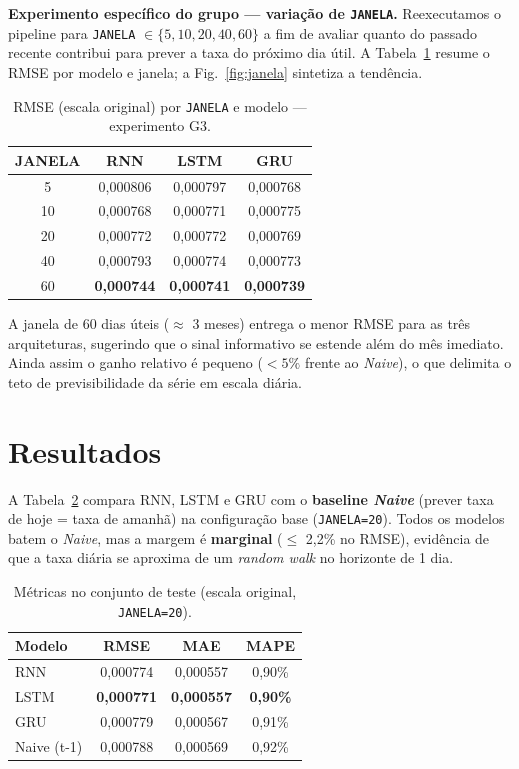 \documentclass[11pt,a4paper]{article}
\begin{document}
\textbf{Experimento específico do grupo --- variação de \texttt{JANELA}.} Reexecutamos o pipeline para \texttt{JANELA} $\in \{5, 10, 20, 40, 60\}$ a fim de avaliar quanto do passado recente contribui para prever a taxa do próximo dia útil. A Tabela~\ref{tab:janela} resume o RMSE por modelo e janela; a Fig.~\ref{fig:janela} sintetiza a tendência.

\begin{table}[h]
\centering
\small
\caption{RMSE (escala original) por \texttt{JANELA} e modelo --- experimento G3.}
\label{tab:janela}
\begin{tabular}{cccc}
\toprule
\textbf{JANELA} & \textbf{RNN} & \textbf{LSTM} & \textbf{GRU} \\
\midrule
5  & 0,000806 & 0,000797 & 0,000768 \\
10 & 0,000768 & 0,000771 & 0,000775 \\
20 & 0,000772 & 0,000772 & 0,000769 \\
40 & 0,000793 & 0,000774 & 0,000773 \\
60 & \textbf{0,000744} & \textbf{0,000741} & \textbf{0,000739} \\
\bottomrule
\end{tabular}
\end{table}

A janela de 60 dias úteis ($\approx$ 3 meses) entrega o menor RMSE para as três arquiteturas, sugerindo que o sinal informativo se estende além do mês imediato. Ainda assim o ganho relativo é pequeno ($<5\%$ frente ao \emph{Naive}), o que delimita o teto de previsibilidade da série em escala diária.

\section{Resultados}
A Tabela~\ref{tab:metricas} compara RNN, LSTM e GRU com o \textbf{baseline \emph{Naive}} (prever taxa de hoje = taxa de amanhã) na configuração base (\texttt{JANELA=20}). Todos os modelos batem o \emph{Naive}, mas a margem é \textbf{marginal} ($\leq$ 2,2\% no RMSE), evidência de que a taxa diária se aproxima de um \emph{random walk} no horizonte de 1 dia.

\begin{table}[h]
\centering
\small
\caption{Métricas no conjunto de teste (escala original, \texttt{JANELA=20}).}
\label{tab:metricas}
\begin{tabular}{lccc}
\toprule
\textbf{Modelo} & \textbf{RMSE} & \textbf{MAE} & \textbf{MAPE} \\
\midrule
RNN          & 0,000774 & 0,000557 & 0,90\% \\
LSTM         & \textbf{0,000771} & \textbf{0,000557} & \textbf{0,90\%} \\
GRU          & 0,000779 & 0,000567 & 0,91\% \\
Naive (t-1)  & 0,000788 & 0,000569 & 0,92\% \\
\bottomrule
\end{tabular}
\end{table}
\end{document}
